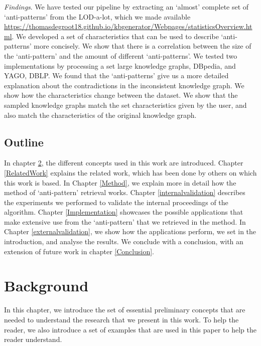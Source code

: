 \documentclass[11pt,letterpaper ,oneside ]{book}
\begin{document}
	\textit{Findings}. We have tested our pipeline by extracting an `almost' complete set of `anti-patterns' from the LOD-a-lot\cite{JavierD:2017}, which we made available \\ \url{https://thomasdegroot18.github.io/kbgenerator/Webpages/statisticsOverview.html}. We developed a set of characteristics that can be used to describe `anti-patterns' more concisely. 
	We show that there is a correlation between the size of the `anti-pattern' and the amount of different `anti-patterns'. 
	We tested two implementations by processing a set large knowledge graphs, DBpedia\cite{DBpedia}, and YAGO\cite{YAGO}, DBLP\cite{DBLP}.
	We found that the `anti-patterns' give us a more detailed explanation about the contradictions in the inconsistent knowledge graph. 
	We show how the characteristics change between the dataset. We show that the sampled knowledge graphs match the set characteristics given by the user, and also match the characteristics of the original knowledge graph.\\
	
	\section{Outline}
	In chapter \ref{Background}, the different concepts used in this work are introduced. Chapter \ref{RelatedWork} explains the related work, which has been done by others on which this work is based.
	In Chapter \ref{Method}, we explain more in detail how the method of `anti-pattern' retrieval works. Chapter \ref{internalvalidation} describes the experiments we performed to validate the internal proceedings of the algorithm. Chapter \ref{Implementation} showcases the possible applications that make extensive use from the `anti-pattern' that we retrieved in the method. In Chapter \ref{externalvalidation}, we show how the applications perform, we set in the introduction, and analyse the results. We conclude with a conclusion, with an extension of future work in chapter \ref{Conclusion}.
	
	
	\newpage
	\chapter{Background}\label{Background}
	In this chapter, we introduce the set of essential preliminary concepts that are needed to understand the research that we present in this work. To help the reader, we also introduce a set of examples that are used in this paper to help the reader understand.
	
\end{document}
